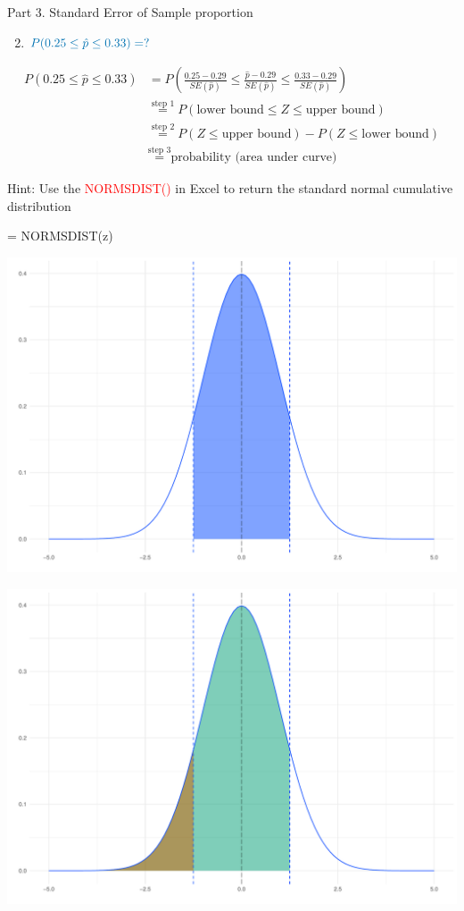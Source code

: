 \documentclass[
  10pt,
  ignorenonframetext,
]{beamer}
\newenvironment{Shaded}{\begin{snugshade}}{\end{snugshade}}
\newcommand{\NormalTok}[1]{#1}
\providecommand{\tightlist}{%
  \setlength{\itemsep}{0pt}\setlength{\parskip}{0pt}}
\begin{document}
\begin{frame}[fragile]{Part 3. Standard Error of Sample proportion}
\protect\hypertarget{part-3.-standard-error-of-sample-proportion-3}{}
\begin{enumerate}
\setcounter{enumi}{1}
\tightlist
\item
  \(\color{blue}{P(0.25 \leq \hat{p} \leq 0.33) = ?}\)
\end{enumerate}

\small

\[
\begin{aligned}
P(0.25 \leq \hat{p} \leq 0.33) &= P\left(\frac{0.25 - 0.29}{SE(\hat{p})} \leq \frac{\hat{p} - 0.29}{SE(\hat{p})} \leq \frac{0.33 - 0.29}{SE(\hat{p})}\right)\\
&\overset{\text{step 1}}{=} P\left(\text{lower bound} \leq Z \leq \text{upper bound}\right)\\
&\overset{\text{step 2}}{=} P\left(Z \leq \text{upper bound}\right) - P(Z \leq \text{lower bound})\\
&\overset{\text{step 3}}{=} \text{probability (area under curve)}
\end{aligned}
\]

Hint: Use the \textcolor{red}{NORMSDIST()} in Excel to return the
standard normal cumulative distribution

\begin{Shaded}
\begin{Highlighting}[]
\NormalTok{= NORMSDIST(z)}
\end{Highlighting}
\end{Shaded}
\end{frame}

\begin{frame}{}
\protect\hypertarget{section}{}
\begin{center}\includegraphics[width=0.5\linewidth]{ECON1013-Lab2_files/figure-beamer/unnamed-chunk-7-1} \end{center}

\begin{center}\includegraphics[width=0.5\linewidth]{ECON1013-Lab2_files/figure-beamer/unnamed-chunk-7-2} \end{center}
\end{frame}
\end{document}
